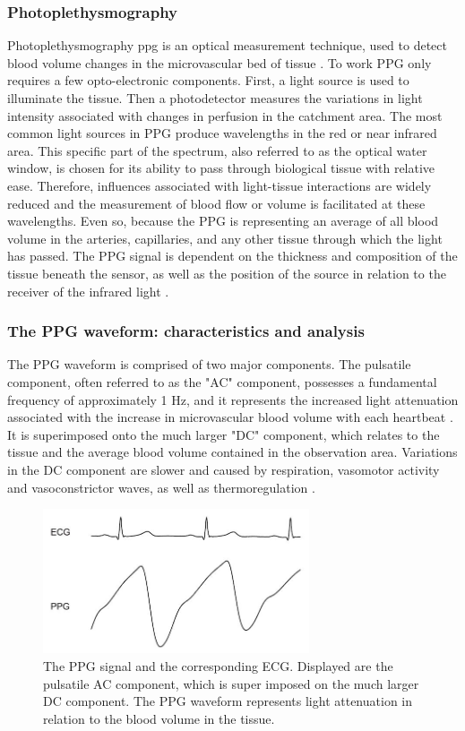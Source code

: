\subsubsection{Photoplethysmography}
Photoplethysmography \gls{ppg} is an optical measurement technique, used to detect blood volume changes in the microvascular bed of tissue \cite{Allan2007}. To work PPG only requires a few opto-electronic components. First, a light source is used to illuminate the tissue. Then a photodetector measures the variations in light intensity associated with changes in perfusion in the catchment area. 
The most common light sources in PPG produce wavelengths in the red or near infrared area. This specific part of the spectrum, also referred to as the optical water window, is chosen for its ability to pass through biological tissue with relative ease. Therefore, influences associated with light-tissue interactions are widely reduced and the measurement of blood flow or volume is facilitated at these wavelengths.
Even so, because the PPG is representing an average of all blood volume in the arteries, capillaries, and any other tissue through which the light has passed. The
PPG signal is dependent on the thickness and composition of the tissue beneath the sensor, as well as the position of the source in relation to the receiver of the infrared light \cite{Peper2007}.

\subsubsection{The PPG waveform: characteristics and analysis} 
The PPG waveform is comprised of two major components. The pulsatile component, often referred to as the "AC" component, possesses a fundamental frequency of approximately 1 Hz, and it represents the increased light attenuation associated with the increase in microvascular blood volume with each heartbeat \cite{Allan2007}. It is superimposed onto the much larger "DC" component, which relates to the tissue and the average blood volume contained in the observation area. Variations in the DC component are slower and caused by respiration, vasomotor activity and vasoconstrictor waves, as well as thermoregulation \cite{Allan2007}.

\begin{figure}[h!]
	\centering
  \includegraphics[width=0.7\textwidth, angle=0]{images/ppg_raw.jpg}
	\caption[PPG, and ECG Waveform]{The PPG signal and the corresponding ECG. Displayed are the pulsatile AC component, which is super imposed on the much larger DC component. The PPG waveform represents light attenuation in relation to the blood volume in the tissue.}
	\label{ppg_raw}
\end{figure}

